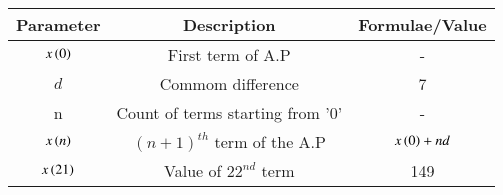 \renewcommand{\arraystretch}{2}
\begin{tabular}{|c|c|c|}
\hline 
\setlength{\tabcolsep}{1pt}
\textbf{Parameter}  &\textbf{Description} &\textbf{Formulae/Value} \\
\hline
$x\left(0\right)$ & First term of A.P & - \\
\hline
\textbf{$d$} & Commom difference & 7 \\
\hline
n & Count of terms starting from '0' & - \\
\hline
$x\left(n\right)$ & $(n+1)^{th}$ term of the A.P & $x\left(0\right) + nd$ \\
\hline
$x\left(21\right)$ & Value of $22^{nd}$ term & 149 \\

\hline

\end{tabular}
